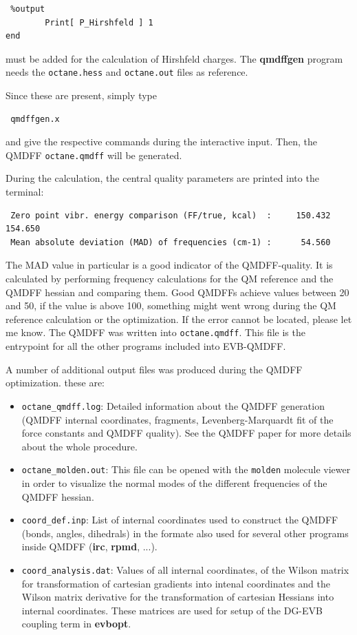 \documentclass[12pt,a4paper]{scrartcl}
\begin{document}
\begin{verbatim}
 %output
        Print[ P_Hirshfeld ] 1
end
\end{verbatim}

must be added for the calculation of Hirshfeld charges.
The \textbf{qmdffgen} program needs the \texttt{octane.hess} and \texttt{octane.out} files 
as reference. 

Since these are present, simply type 

\begin{verbatim}
 qmdffgen.x
\end{verbatim}


and give the respective commands during the interactive input.
Then, the QMDFF \texttt{octane.qmdff} will be generated.

During the calculation, the central quality parameters are printed into the terminal:

\begin{verbatim}
 Zero point vibr. energy comparison (FF/true, kcal)  :     150.432     154.650
 Mean absolute deviation (MAD) of frequencies (cm-1) :      54.560
\end{verbatim}

The MAD value in particular is a good indicator of the QMDFF-quality. It is calculated by 
performing frequency calculations for the QM reference and the QMDFF hessian and comparing 
them. Good QMDFFs achieve values between 20 and 50, if the value is above 100, something 
might went wrong during the QM reference calculation or the optimization.
If the error cannot be located, please let me know.
The QMDFF was written into \texttt{octane.qmdff}. This file is the entrypoint for 
all the other programs included into EVB-QMDFF.

A number of additional output files was produced during the QMDFF optimization.
these are:

\begin{itemize}
 \item \texttt{octane\_qmdff.log}: Detailed information about the QMDFF generation (QMDFF internal
      coordinates, fragments, Levenberg-Marquardt fit of the force constants and QMDFF quality).
      See the QMDFF paper \cite{qmdff} for more details about the whole procedure.
 \item \texttt{octane\_molden.out}: This file can be opened with the \texttt{molden} molecule 
      viewer in order to visualize the normal modes of the different frequencies of the 
      QMDFF hessian.
 \item \texttt{coord\_def.inp}: List of internal coordinates used to construct the QMDFF (bonds, 
      angles, dihedrals) in the formate also used for several other programs inside QMDFF
      (\textbf{irc}, \textbf{rpmd}, ...).
 \item \texttt{coord\_analysis.dat}: Values of all internal coordinates, of the Wilson matrix for 
      transformation of cartesian gradients into intenal coordinates and the Wilson matrix 
      derivative for the transformation of cartesian Hessians into internal coordinates. 
      These matrices are used for setup of the DG-EVB coupling term in \textbf{evbopt}.
\end{itemize}
\end{document}

